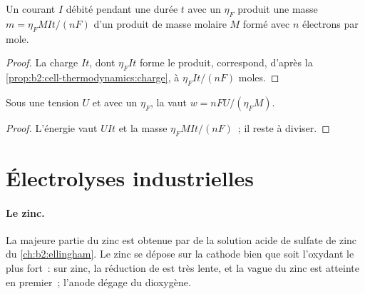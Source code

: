 \begin{proposition}\label{prop:b2:batteries-electrolysis:faraday-mass}
Un courant $I$ débité pendant une durée $t$ avec un  $\eta_F$ produit une
masse $m = \eta_F MIt/(nF)$ d'un produit de masse molaire $M$ formé avec $n$
électrons par mole.
\end{proposition}

\begin{proof}
La charge $It$, dont $\eta_F It$ forme le produit, correspond, d'après la
\cref{prop:b2:cell-thermodynamics:charge}, à $\eta_F It/(nF)$ moles.
\end{proof}

\begin{proposition}\label{prop:b2:batteries-electrolysis:energy}
Sous une tension $U$ et avec un  $\eta_F$, la  vaut $w = nFU/(\eta_F M)$.
\end{proposition}

\begin{proof}
L'énergie vaut $UIt$ et la masse $\eta_F MIt/(nF)$~; il reste à diviser.
\end{proof}

\section{Électrolyses industrielles}

\paragraph{Le zinc.} La majeure partie du zinc est obtenue par  de la solution acide de sulfate de zinc
du \cref{ch:b2:ellingham}. Le zinc se dépose sur la cathode bien que
 soit l'oxydant le plus fort~: sur zinc, la réduction de  est très lente,
et la vague du zinc est atteinte en premier~; l'anode dégage du dioxygène.

